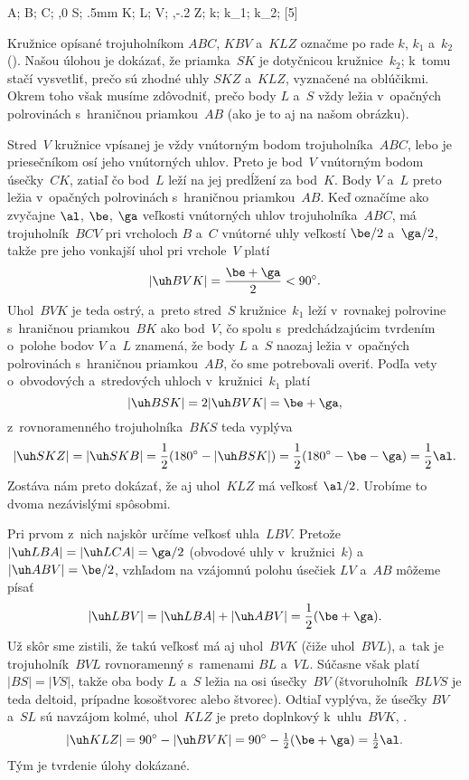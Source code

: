 {%
\fontplace
\tpoint A; \lpoint B; \bpoint C;
\rbpoint{},0 S; \rBpoint\toleft.5mm K; \tpoint L;
\rpoint V; \rbpoint{},-.2 Z;
\rpoint k; \rpoint k_1; \rpoint k_2;
[5] \hfil\Obr

Kružnice opísané trojuholníkom $ABC$, $KBV$ a~$KLZ$ označme po
rade $k$, $k_1$ a~$k_2$ (\obr). Našou úlohou je dokázať, že
priamka~$SK$ je dotyčnicou kružnice~$k_2$; k~tomu stačí vysvetliť,
prečo sú zhodné uhly $SKZ$ a~$KLZ$, vyznačené na 
oblúčikmi. Okrem toho však musíme zdôvodniť, prečo body $L$ a~$S$
vždy ležia v~opačných polrovinách s~hraničnou priamkou~$AB$ (ako je
to aj na našom obrázku).

\midinsert
\inspicture{}
\endinsert

Stred~$V$ kružnice vpísanej je vždy vnútorným bodom trojuholníka~$ABC$,
lebo je priesečníkom osí jeho vnútorných uhlov.
Preto je bod~$V$ vnútorným bodom úsečky~$CK$, zatiaľ čo bod~$L$
leží na jej predĺžení za bod~$K$. Body $V$ a~$L$ preto
ležia v~opačných polrovinách s~hraničnou priamkou~$AB$.
Keď označíme ako zvyčajne $\al$, $\be$, $\ga$ veľkosti vnútorných
uhlov trojuholníka~$ABC$, má trojuholník~$BCV$ pri vrcholoch $B$ a~$C$
vnútorné uhly veľkostí $\be/2$ a~$\ga/2$,
takže pre jeho vonkajší uhol pri vrchole~$V$ platí
$$
|\uh BVK|=\frac{\be+\ga}2<90^{\circ}.
$$
Uhol~$BVK$ je teda ostrý, a~preto stred~$S$ kružnice~$k_1$ leží
v~rovnakej polrovine s~hraničnou priamkou~$BK$ ako bod~$V$, čo
spolu s~predchádzajúcim tvrdením o~polohe bodov $V$ a~$L$ znamená, že
body $L$ a~$S$ naozaj ležia v~opačných polrovinách s~hraničnou
priamkou~$AB$, čo sme potrebovali overiť. Podľa vety
o~obvodových a~stredových uhloch v~kružnici~$k_1$ platí
$$
|\uh BSK|=2|\uh BVK|=\be+\ga,
$$
z~rovnoramenného trojuholníka~$BKS$ teda vyplýva
$$
|\uh SKZ|=|\uh SKB|=\frac12(180^{\circ}-|\uh BSK|)=
\frac12(180^{\circ}-\be-\ga)=\frac12\al.
$$
Zostáva nám preto dokázať, že aj uhol~$KLZ$ má veľkosť
$\al/2$. Urobíme to dvoma nezávislými spôsobmi.

\smallskip
Pri prvom z~nich najskôr určíme veľkosť uhla~$LBV$. Pretože
$|\uh LBA|=|\uh LCA|=\ga/2$ (obvodové uhly v~kružnici~$k$)
a~$|\uh ABV|=\be/2$, vzhľadom na vzájomnú polohu
úsečiek $LV$ a~$AB$ môžeme písať
$$
|\uh LBV|=|\uh LBA|+|\uh ABV|=\frac12(\be+\ga).
$$
Už skôr sme zistili, že takú veľkosť má aj uhol~$BVK$
(čiže uhol~$BVL$), a~tak je trojuholník~$BVL$
rovnoramenný s~ramenami $BL$ a~$VL$. Súčasne však platí $|BS|=|VS|$, takže oba body $L$
a~$S$ ležia na osi úsečky~$BV$ (štvoruholník~$BLVS$ je teda
deltoid, prípadne kosoštvorec alebo štvorec). Odtiaľ vyplýva, že úsečky
$BV$ a~$SL$ sú navzájom kolmé, uhol~$KLZ$ je preto
doplnkový k~uhlu~$BVK$, \tj.
$$
\postdisplaypenalty 10000
|\uh KLZ|=90^{\circ}-|\uh BVK|=90^{\circ}-\tfrac12(\be+\ga)=
\tfrac12\al.
$$
Tým je tvrdenie úlohy dokázané.

}
